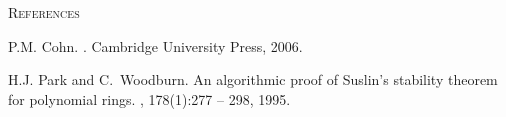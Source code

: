 \vspace{1em}

\begin{center}
	{\normalsize \textsc{References}}
\end{center}


\begin{thebibliography}{PW95}

P.M. Cohn.
.
\newblock Cambridge University Press, 2006.

H.J. Park and C.~Woodburn.
\newblock An algorithmic proof of {S}uslin's stability theorem for polynomial
  rings.
, 178(1):277 -- 298, 1995.


\end{thebibliography}


\endgroup




